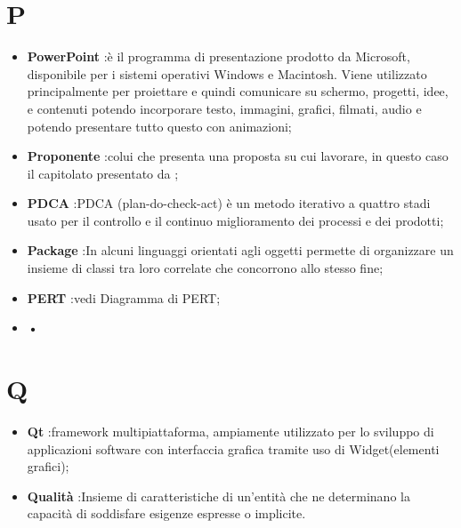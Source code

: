 %


\section*{P} %
\label{sec:p}
	\begin{itemize}
		\item \textbf{PowerPoint} :è il programma di presentazione prodotto da Microsoft, disponibile per i sistemi operativi Windows e Macintosh. Viene utilizzato principalmente per proiettare e quindi comunicare su schermo, progetti, idee, e contenuti potendo incorporare testo, immagini, grafici, filmati, audio e potendo presentare tutto questo con animazioni;
		\item \textbf{Proponente} :colui che presenta una proposta su cui lavorare, in questo caso il capitolato presentato da \proposerName;
		\item \textbf{PDCA} :PDCA (plan-do-check-act) è un metodo iterativo a quattro stadi usato per il controllo e il continuo miglioramento dei processi e dei prodotti;
		\item \textbf{Package} :In alcuni linguaggi orientati agli oggetti permette di organizzare un insieme di classi tra loro correlate che concorrono allo stesso fine;
		\item \textbf{PERT} :vedi Diagramma di PERT;
		\item \textbf{•}
	\end{itemize}

\section*{Q} %
\label{sec:q}
	\begin{itemize}
		\item \textbf{Qt} :framework multipiattaforma, ampiamente utilizzato per lo sviluppo di applicazioni software con interfaccia grafica tramite uso di Widget(elementi grafici);
		\item \textbf{Qualità} :Insieme di caratteristiche di un'entità che ne determinano la capacità di soddisfare esigenze espresse o implicite.	
	\end{itemize}

